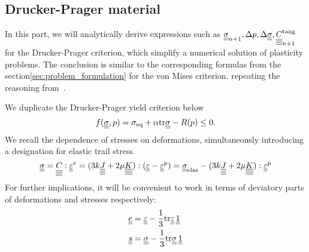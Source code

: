 \documentclass[12pt]{article}
\begin{document}
\newpage
\begin{appendices}
    \section{Drucker-Prager material}
    \label{appendix:DP}
    In this part, we will analytically derive expressions such as $\uusigman, \Delta p, \Delta\uusigma, \uuuuC{}^\text{tang}_{n+1}$ for the Drucker-Prager criterion, which simplify a numerical solution of plasticity problems. The conclusion is similar to the corresponding formulas from the section\ref{sec:problem_formulation} for the von Mises criterion, repeating the reasoning from~\cite{bonnet:hal-01083772}.

    We duplicate the Drucker-Prager yield criterion below 
    \begin{equation}
        f(\uusigma, p) = \sigma_{\text{eq}} + \alpha \mtr \uusigma - R(p) \leq 0.
    \end{equation}
    We recall the dependence of stresses on deformations, simultaneously introducing a designation for elastic trail stress.
    \begin{equation}
        \uusigma = \uuuuC{} : \uueps^e = (3k\uuuuJ + 2\mu\uuuuK) : (\uueps - \uueps^p) = \uusigma_\text{elas} - (3k\uuuuJ + 2\mu\uuuuK) : \uueps^p 
    \end{equation}
    For further implications, it will be convenient to work in terms of deviatory parts of deformations and stresses respectively:
    \begin{align*}
        & \uue = \uueps - \frac{1}{3}\mtr\uueps \, \uuUnit \\
        & \uus = \uusigma - \frac{1}{3}\mtr\uusigma \, \uuUnit 
    \end{align*}
    

\end{appendices}
\end{document}
